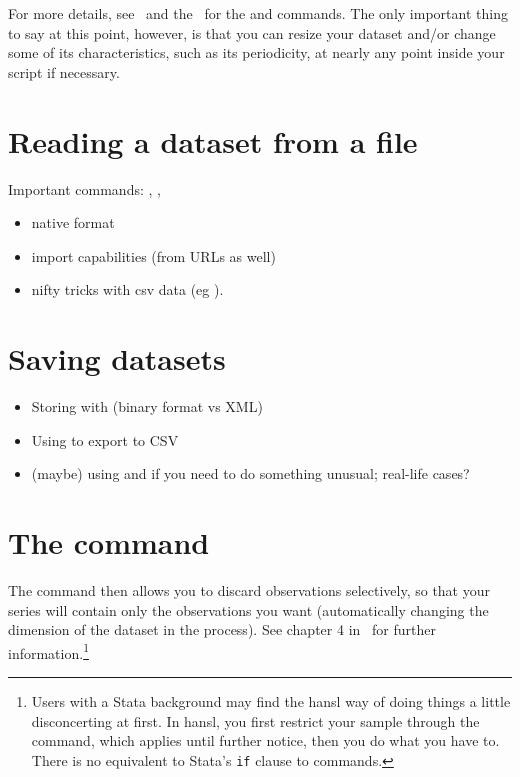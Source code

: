For more details, see \GUG\ and the \GCR\ for the  and
 commands. The only important thing to say at this point,
however, is that you can resize your dataset and/or change some of its
characteristics, such as its periodicity, at nearly any point inside
your script if necessary.

\section{Reading a dataset from a file}

Important commands: , , 

\begin{itemize}
\item native format
\item import capabilities (from URLs as well)
\item nifty tricks with csv data (eg ).
\end{itemize}

\section{Saving datasets}

\begin{itemize}
\item Storing with  (binary format vs XML)
\item Using  to export to CSV
\item (maybe) using  and  if you need to do
  something unusual; real-life cases?
\end{itemize}

\section{The  command}

The  command then allows
you to discard observations selectively, so that your series will
contain only the observations you want (automatically changing the
dimension of the dataset in the process). See chapter 4 in \GUG\ for
further information.\footnote{Users with a Stata background may find
  the hansl way of doing things a little disconcerting at first. In
  hansl, you first restrict your sample through the 
  command, which applies until further notice, then you do what you
  have to. There is no equivalent to Stata's \texttt{if} clause to
  commands.}

